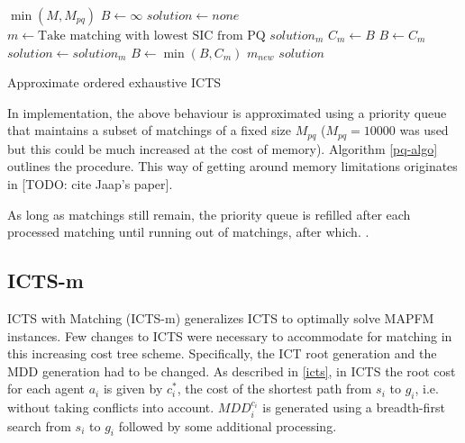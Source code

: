 \documentclass[english]{article}
\begin{document}
		\begin{algorithm}
		\begin{algorithmic}[1]
			\State {}$\min(M,M_{pq})$
			\State $B \gets \infty$
			\State $solution \gets none$
			\Repeat
			\State $m\gets\text{Take matching with lowest SIC from PQ}$
			\State $solution_m$  $C_m\gets$$B$ 
			\State $B\gets C_m$
			\State $solution \gets solution_m$
			\EndIf
			\State $B\gets\min(B,C_m)$
			\State {}$m_{new}$
			\EndIf
			\Return $solution$
		\end{algorithmic}
		\caption{Approximate ordered exhaustive ICTS} 
		\label{pq-algo}
	\end{algorithm}

	In implementation, the above behaviour is approximated using a priority queue that maintains a subset of matchings of a fixed size $M_{pq}$ ($M_{pq} = 10000$ was used but this could be much increased at the cost of memory). Algorithm \ref{pq-algo} outlines the procedure. This way of getting around memory limitations originates in [TODO: cite Jaap's paper].
	
	 As long as matchings still remain, the priority queue is refilled after each processed matching until running out of matchings, after which. . 

	
	\subsection{ICTS-m}
	ICTS with Matching (ICTS-m) generalizes ICTS to optimally solve MAPFM instances. Few changes to ICTS were necessary to accommodate for matching in this increasing cost tree scheme. Specifically, the ICT root generation and the MDD generation had to be changed. As described in \ref{icts}, in ICTS the root cost for each agent $a_i$ is given by $c^*_i$, the cost of the shortest path from $s_i$ to $g_i$, i.e. without taking conflicts into account. $MDD_i^{c_i}$ is generated using a breadth-first search from $s_i$ to $g_i$ followed by some additional processing.
\end{document}
